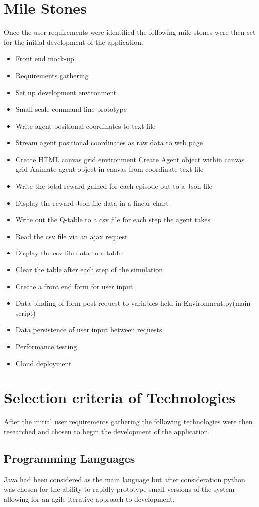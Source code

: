 \section{Mile Stones}
Once the user requirements were identified the following mile stones were then set for the initial development of the application.
\begin{itemize}
	\item Front end mock-up
	\item Requirements gathering
	\item Set up development environment
	\item Small scale command line prototype
	\item Write agent positional coordinates to text file
	\item Stream agent positional coordinates as raw data to web page
	\item Create HTML canvas grid environment
	\subitem Create Agent object within canvas grid
	\subitem Animate agent object in canvas from coordinate text file
	\item Write the total reward gained for each episode out to a Json file
	\item Display the reward Json file data in a linear chart
	\item Write out the Q-table to a csv file for each step the agent takes
	\item Read the csv file via an ajax request
	\item Display the csv file data to a table 
	\item Clear the table after each step of the simulation
	\item Create a front end form for user input
	\item Data binding of form post request to variables held in Environment.py(main script)
	\item Data persistence of user input between requests
	\item Performance testing
	\item Cloud deployment
\end{itemize}
\section{Selection criteria of Technologies}
After the initial user requirements gathering the following technologies were then researched and chosen to begin the development of the application.

\subsection{Programming Languages}
Java had been considered as the main language but after consideration python was chosen for the ability to rapidly prototype small versions of the system allowing for an agile iterative approach to development.

